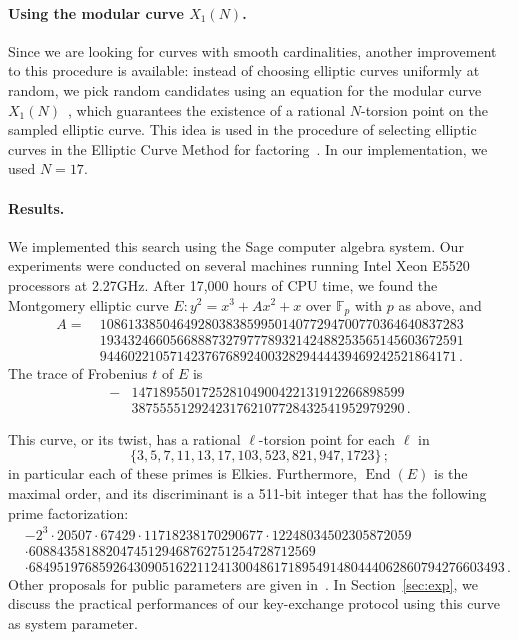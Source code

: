\documentclass{llncs}
\newcommand{\F}{\mathbb{F}}
\DeclareMathOperator{\End}{End}
\begin{document}
\paragraph{Using the modular curve $X_1(N)$.}
Since we are looking for curves with smooth cardinalities, another
improvement to this procedure is available: instead of choosing elliptic
curves uniformly at random, we pick random candidates using
an equation for the modular curve $X_1(N)$~\cite{sutherland2012constructing},
which guarantees the existence of a rational $N$-torsion point
on the sampled elliptic curve.
This idea is used
in the procedure of selecting elliptic curves in the Elliptic Curve Method
for factoring~\cite{ECM20,GMP-ECM}.
In our implementation, we used $N = 17$. 

\paragraph{Results.}
We implemented this search using the Sage computer algebra system.
Our experiments were conducted on several machines running
Intel Xeon E5520 processors at 2.27GHz. %
After 17,000 hours of CPU time, we found the Montgomery elliptic curve 
$
	E : y^2 = x^3 + A x^2 + x
$
over $\F_p$ with $p$ as above, and
\[
\begin{aligned}
A =\ 
& 1086133850464928038385995014077294700770364640837283 \\
& 1934324660566888732797778932142488253565145603672591 \\
& 944602210571423767689240032829444439469242521864171\,.
\end{aligned}
\]
The trace of Frobenius $t$ of $E$ is
\[
\begin{aligned}
-&147189550172528104900422131912266898599 \\
&387555512924231762107728432541952979290\,.
\end{aligned}
\]

This curve, or its twist, has a rational $\ell$-torsion point 
for each $\ell$ in
\[
  \{3, 5, 7, 11, 13, 17, 103, 523, 821, 947, 1723\}
  \,;
\]
in particular each of these primes is Elkies.
Furthermore, $\End(E)$ is the maximal order, and its discriminant is
a 511-bit integer that has the following prime factorization:
\[
\begin{aligned}
& \scriptstyle -2^3 \cdot 20507 \cdot 67429 \cdot 11718238170290677 \cdot 12248034502305872059 \\
& \scriptstyle \cdot 60884358188204745129468762751254728712569\\
& \scriptstyle \cdot 68495197685926430905162211241300486171895491480444062860794276603493\,.
\end{aligned}
\]
Other proposals for public parameters are given in~\cite{memoire}.
In Section~\ref{sec:exp}, we discuss the practical performances
of our key-exchange protocol using this curve as system parameter.
\end{document}
